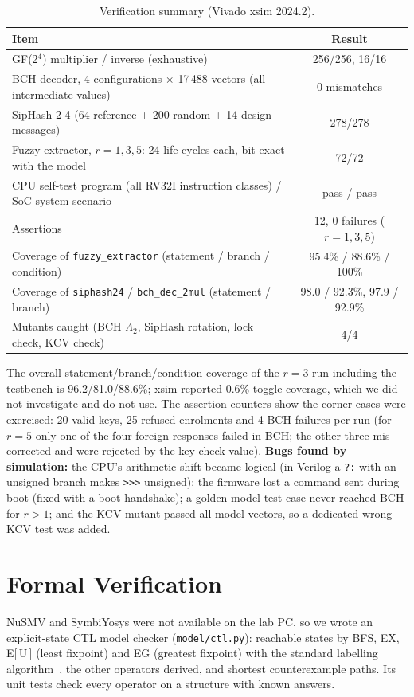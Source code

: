 \documentclass[11pt,a4paper]{article}
\begin{document}
\begin{table}[H]\centering\small
\caption{Verification summary (Vivado xsim 2024.2).}\label{tab:simsummary}
\begin{tabular}{@{}lc@{}}
\toprule
Item & Result\\
\midrule
GF(2$^4$) multiplier / inverse (exhaustive) & 256/256, 16/16\\
BCH decoder, 4 configurations $\times$ 17\,488 vectors (all intermediate values) & 0 mismatches\\
SipHash-2-4 (64 reference + 200 random + 14 design messages) & 278/278\\
Fuzzy extractor, $r=1,3,5$: 24 life cycles each, bit-exact with the model & 72/72\\
CPU self-test program (all RV32I instruction classes) / SoC system scenario & pass / pass\\
Assertions & 12, 0 failures ($r=1,3,5$)\\
Coverage of \texttt{fuzzy\_extractor} (statement / branch / condition) & 95.4\% / 88.6\% / 100\%\\
Coverage of \texttt{siphash24} / \texttt{bch\_dec\_2mul} (statement / branch) & 98.0 / 92.3\%, 97.9 / 92.9\%\\
Mutants caught (BCH $\Lambda_2$, SipHash rotation, lock check, KCV check) & 4/4\\
\bottomrule
\end{tabular}
\end{table}
The overall statement/branch/condition coverage of the $r=3$ run including the testbench is
96.2/81.0/88.6\%; xsim reported 0.6\% toggle coverage, which we did not investigate and do not use.
The assertion counters show the corner cases were exercised: 20 valid keys, 25 refused enrolments and
4 BCH failures per run (for $r=5$ only one of the four foreign responses failed in BCH; the other three
mis-corrected and were rejected by the key-check value). \textbf{Bugs found by simulation:} the CPU's
arithmetic shift became logical (in Verilog a \texttt{?:} with an unsigned branch makes \texttt{>>>}
unsigned); the firmware lost a command sent during boot (fixed with a boot handshake); a golden-model
test case never reached BCH for $r>1$; and the KCV mutant passed all model vectors, so a dedicated
wrong-KCV test was added.

\section{Formal Verification}
\label{sec:formal}
NuSMV and SymbiYosys were not available on the lab PC, so we wrote an explicit-state CTL model checker
(\texttt{model/ctl.py}): reachable states by BFS, EX, E[$\,$U$\,$] (least fixpoint) and EG (greatest
fixpoint) with the standard labelling algorithm~\cite{clarke86}, the other operators derived, and
shortest counterexample paths. Its unit tests check every operator on a structure with known answers.
\end{document}
